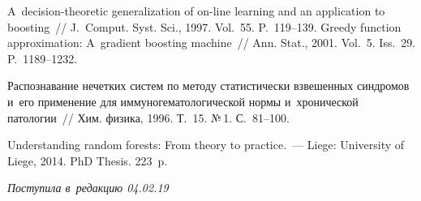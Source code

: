\begin{multicols}{2}
{{\begin{thebibliography}{9}
 A~decision-theoretic generalization of on-line learning and an 
application to boosting~// J.~Comput. Syst. Sci., 1997. Vol.~55. P.~119--139.
 Greedy function approximation: A~gradient boosting machine~//  
Ann. Stat., 2001. Vol.~5. Iss.~29. P.~1189--1232.

 Распознавание нечетких 
систем по методу статистически взвешенных синдромов и~его применение для 
иммуногематологической нормы и~хронической патологии~// Хим. физика, 
1996. Т.~15. №\,1. С.~81--100.

 Understanding random forests: From theory to practice.~--- 
Liege: University of Liege, 2014.  PhD Thesis. 223~p.
 \end{thebibliography}

 }
 }

\end{multicols}

\vspace*{-6pt}

\hfill{\small\textit{Поступила в~редакцию 04.02.19}}



\newpage

\vspace*{-28pt}





\def\tit{RESEARCH OF~THE~POSSIBILITY TO~FORECAST CHANGES 
IN~FINANCIAL STATE OF~A~CREDIT ORGANIZATION\\ ON~THE~BASIS 
OF~PUBLIC FINANCIAL STATEMENTS}


\def\titkol{Research of~the~possibility to~forecast changes in 
financial state of a credit organization on~the~basis 
of~public financial statements}

\def\aut{Yu.\,I.~Zhuravlev$^{1,2}$, O.\,V.~Sen'ko$^1$, 
N.\,N.~Bondarenko$^2$, V.\,V.~Ryazanov$^1$, A.\,A.~Dokukin$^1$, 
and~A.\,P.~Vinogradov$^1$}

\def\autkol{Yu.\,I.~Zhuravlev, O.\,V.~Sen'ko, 
N.\,N.~Bondarenko, et al.}

